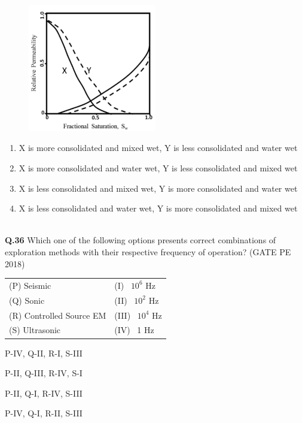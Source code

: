 \documentclass[12pt,a4paper]{article}
\begin{document}
\begin{figure}[h!]
  \centering
  \includegraphics[width=0.5\textwidth]{pic11.png} 
\end{figure}

\begin{enumerate}[label=(\Alph*)] 

	\item X is more consolidated and mixed wet, Y is less consolidated and water wet
	\item X is more consolidated and water wet, Y is less consolidated and mixed wet
	\item X is less consolidated and mixed wet, Y is more consolidated and water wet
	\item X is less consolidated and water wet, Y is more consolidated and mixed wet\\\\
\end{enumerate}
\noindent\textbf{Q.36} Which one of the following options presents correct combinations of exploration methods with their respective frequency of operation? \hfill (GATE PE 2018)

\vspace{0.3cm}
\begin{tabular}{ll}
(P) Seismic               & (I) ~$10^6$ Hz \\
(Q) Sonic                 & (II) ~$10^2$ Hz \\
(R) Controlled Source EM & (III) ~$10^4$ Hz \\
(S) Ultrasonic            & (IV) ~1 Hz \\
\end{tabular}

\vspace{0.3cm}
\begin{enumerate}[label=(\Alph*)] 
\begin{multicols}{2}
\item P-IV, Q-II, R-I, S-III \item P-II, Q-III, R-IV, S-I \\
\item P-II, Q-I, R-IV, S-III \item P-IV, Q-I, R-II, S-III \\
\end{multicols}
\end{enumerate}
\end{document}
